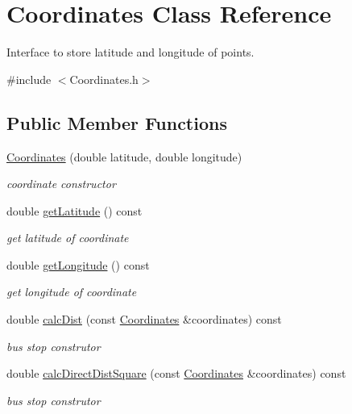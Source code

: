 \hypertarget{class_coordinates}{}\section{Coordinates Class Reference}
\label{class_coordinates}


Interface to store latitude and longitude of points.  




{\ttfamily \#include $<$Coordinates.\+h$>$}

\subsection*{Public Member Functions}
\begin{DoxyCompactItemize}
\item 
\hyperlink{class_coordinates_a008a2acb31c4606eac1969bc5f1892f0}{Coordinates} (double latitude, double longitude)
\begin{DoxyCompactList}\small\item\em coordinate constructor \end{DoxyCompactList}\item 
double \hyperlink{class_coordinates_aad64e70c40d1f25458b122559e289c7d}{get\+Latitude} () const 
\begin{DoxyCompactList}\small\item\em get latitude of coordinate \end{DoxyCompactList}\item 
double \hyperlink{class_coordinates_a865746116df79ade68631f5bb695c591}{get\+Longitude} () const 
\begin{DoxyCompactList}\small\item\em get longitude of coordinate \end{DoxyCompactList}\item 
double \hyperlink{class_coordinates_ae5a68f6d9304775a18af48bc3d0fef52}{calc\+Dist} (const \hyperlink{class_coordinates}{Coordinates} \&coordinates) const 
\begin{DoxyCompactList}\small\item\em bus stop construtor \end{DoxyCompactList}\item 
double \hyperlink{class_coordinates_ac0ab9ce22061bba4e6db2c4c27da398c}{calc\+Direct\+Dist\+Square} (const \hyperlink{class_coordinates}{Coordinates} \&coordinates) const 
\begin{DoxyCompactList}\small\item\em bus stop construtor \end{DoxyCompactList}\end{DoxyCompactItemize}


